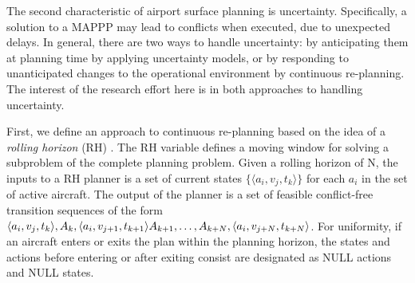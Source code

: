 \documentclass[letterpaper, 10 pt, conference]{ieeeconf}
\begin{document}
The second characteristic of airport surface planning is uncertainty. Specifically, a solution to a MAPPP may lead to conflicts when executed, due to unexpected delays. In general, there are two ways to handle uncertainty: by anticipating them at planning time by applying uncertainty models, or by responding to unanticipated changes to the operational environment by continuous re-planning. The interest of the research effort here is in both approaches to handling uncertainty.

First, we define an approach to continuous re-planning based on the idea of a {\em rolling horizon} (RH) \cite{clare}.   The RH variable defines a moving window for solving a subproblem of the complete planning problem. Given a  rolling horizon of N, the inputs to a RH planner is a set of current states $\{\langle a_i, v_j, t_k \rangle\}$ for each $a_i$ in the set of active aircraft. The output of the planner is a set of feasible conflict-free transition sequences of the form $\langle a_i, v_j, t_k \rangle, A_k, \langle a_i, v_{j+1}, t_{k+1}\rangle A_{k+1}, \ldots ,  A_{k+N}, \\ \langle a_i, v_{j+N}, t_{k+N} \rangle$. For uniformity, if an aircraft enters or exits the plan within the planning horizon, the states and actions before entering or after exiting consist are designated as NULL actions and NULL states.
\end{document}
